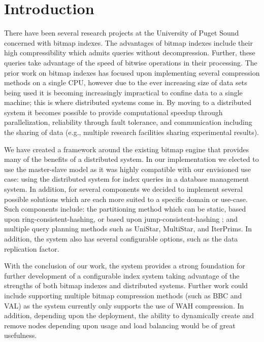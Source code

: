 \section{Introduction}
There have been several research projects at the University of Puget Sound concerned with bitmap indexes.
The advantages of bitmap indexes include their high compressibility which admits queries without decompression.
Further, these queries take advantage of the speed of bitwise operations in their processing.
The prior work on bitmap indexes has focused upon implementing several compression methods on a single CPU,
however due to the ever increasing size of data sets being used it is becoming increasingly impractical to confine data to a single machine;
this is where distributed systems come in.
By moving to a distributed system it becomes possible to provide computational speedup through parallelization, reliability through fault tolerance, and communication including the sharing of data (e.g., multiple research facilities sharing experimental results).
\par
We have created a framework around the existing bitmap engine that provides many of the benefits of a distributed system.
In our implementation we elected to use the master-slave model as it was highly compatible with our envisioned use case:
using the distributed system for index queries in a database management system.
In addition, for several components we decided to implement several possible solutions which are each more suited to a specific domain or use-case.
Such components include:
the partitioning method which can be static, based upon ring-consistent-hashing, or based upon jump-consistent-hashing \cite{lamping2014};
and multiple query planning methods such as UniStar, MultiStar, and IterPrims.
In addition, the system also has several configurable options, such as the data replication factor.
\par
With the conclusion of our work, the system provides a strong foundation for further development of a configurable index system taking advantage of the strengths of both bitmap indexes and distributed systems.
Further work could include supporting multiple bitmap compression methods (such as BBC and VAL) as the system currently only supports the use of WAH compression.
In addition, depending upon the deployment, the ability to dynamically create and remove nodes depending upon usage and load balancing would be of great usefulness.
